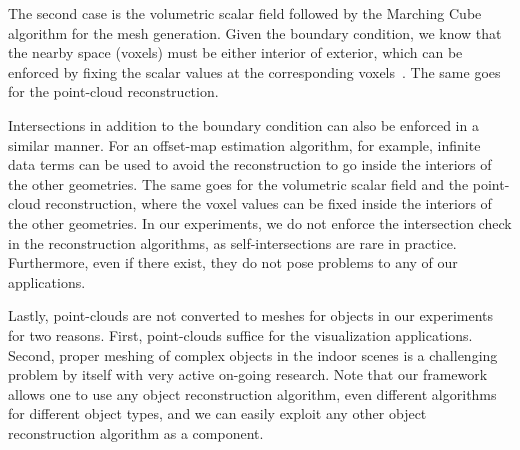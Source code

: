 The second case is the volumetric scalar field followed by the Marching
Cube algorithm for the mesh generation. Given the boundary condition, we
know that the nearby space (voxels) must be either interior of exterior,
which can be enforced by fixing the scalar values at the corresponding
voxels~\cite{shan2014occluding}. The same goes for the point-cloud
reconstruction.

Intersections in addition to the boundary condition can also be enforced
in a similar manner. For an offset-map estimation algorithm, for
example, infinite data terms can be used to avoid the reconstruction to
go inside the interiors of the other geometries. The same goes for the
volumetric scalar field and the point-cloud reconstruction, where the
voxel values can be fixed inside the interiors of the other geometries.
In our experiments, we do not enforce the intersection check in the
reconstruction algorithms, as self-intersections are rare in
practice. Furthermore, even if there exist, they do not pose problems to
any of our applications.







Lastly, point-clouds are not converted to meshes for objects in our
experiments for two reasons. First, point-clouds suffice for the
visualization applications. Second, proper meshing of complex objects in
the indoor scenes is a challenging problem by itself with very active
on-going research. Note that our framework allows one to use any object
reconstruction algorithm, even different algorithms for different
object types, and we can easily exploit any other object reconstruction
algorithm as a component.

